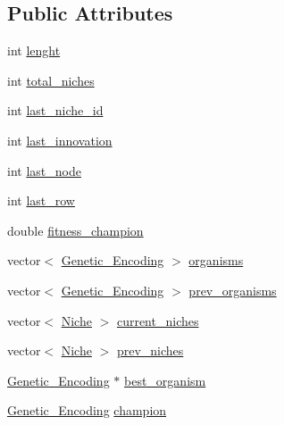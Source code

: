 \subsection*{Public Attributes}
\begin{DoxyCompactItemize}
\item 
int \hyperlink{class_a_n_n___u_s_m_1_1_population_a9a9980d69d2a013d4dfc1388b7d96db6}{lenght}
\item 
int \hyperlink{class_a_n_n___u_s_m_1_1_population_a5dd00b369c21214466d0f155ba0e11ee}{total\-\_\-niches}
\item 
int \hyperlink{class_a_n_n___u_s_m_1_1_population_a609df33a9f9f1221ddf5604ef01dace5}{last\-\_\-niche\-\_\-id}
\item 
int \hyperlink{class_a_n_n___u_s_m_1_1_population_a836ae3c612ff56cac400ddea08893961}{last\-\_\-innovation}
\item 
int \hyperlink{class_a_n_n___u_s_m_1_1_population_a2c53f59115f21a4b42e91f8aca35cdcf}{last\-\_\-node}
\item 
int \hyperlink{class_a_n_n___u_s_m_1_1_population_a158d58cd6154506562b3a4b4cc563034}{last\-\_\-row}
\item 
double \hyperlink{class_a_n_n___u_s_m_1_1_population_a0622623a426583853cd7cc1e16bd9423}{fitness\-\_\-champion}
\item 
vector$<$ \hyperlink{class_a_n_n___u_s_m_1_1_genetic___encoding}{Genetic\-\_\-\-Encoding} $>$ \hyperlink{class_a_n_n___u_s_m_1_1_population_a98468ee8221857cad41ae4d7b2ae01cf}{organisms}
\item 
vector$<$ \hyperlink{class_a_n_n___u_s_m_1_1_genetic___encoding}{Genetic\-\_\-\-Encoding} $>$ \hyperlink{class_a_n_n___u_s_m_1_1_population_ad1ba3ace7157e2763976a1ee1155584b}{prev\-\_\-organisms}
\item 
vector$<$ \hyperlink{class_a_n_n___u_s_m_1_1_niche}{Niche} $>$ \hyperlink{class_a_n_n___u_s_m_1_1_population_aa45357359720f5ce88603d0282d22f17}{current\-\_\-niches}
\item 
vector$<$ \hyperlink{class_a_n_n___u_s_m_1_1_niche}{Niche} $>$ \hyperlink{class_a_n_n___u_s_m_1_1_population_a1103c56991771d6ccae5e1cccaf51db9}{prev\-\_\-niches}
\item 
\hyperlink{class_a_n_n___u_s_m_1_1_genetic___encoding}{Genetic\-\_\-\-Encoding} $\ast$ \hyperlink{class_a_n_n___u_s_m_1_1_population_a00cc470bf44ddbb9c104d3eead923dc3}{best\-\_\-organism}
\item 
\hyperlink{class_a_n_n___u_s_m_1_1_genetic___encoding}{Genetic\-\_\-\-Encoding} \hyperlink{class_a_n_n___u_s_m_1_1_population_a8fadd74c69061f51a5e3ea9a3d4aa516}{champion}

\end{DoxyCompactItemize}
